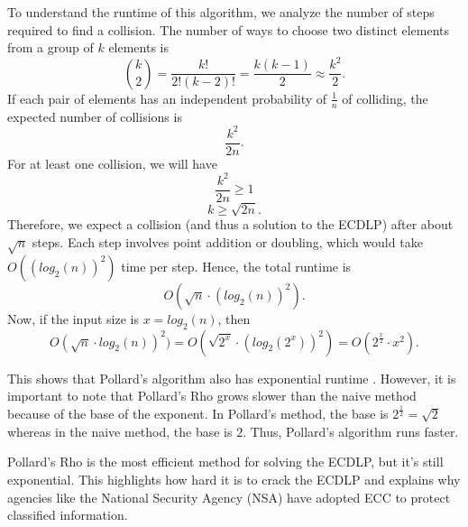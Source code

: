 \documentclass[11pt]{article}
\begin{document}
\vspace{0.3cm}

To understand the runtime of this algorithm, we analyze the number of steps required to find a collision. The number of ways to choose two distinct elements from a group of \(k\) elements is
\[\binom{k}{2} = \frac{k!}{2!(k-2)!} = \frac{k(k-1)}{2} \approx \frac{k^2}{2}.\]
If each pair of elements has an independent probability of \(\frac{1}{n}\) of colliding, the expected number of collisions is
\[\frac{k^2}{2n}.\]
For at least one collision, we will have
\[\frac{k^2}{2n} \geq 1\] 
\[k \geq \sqrt{2n}.\]
Therefore, we expect a collision (and thus a solution to the ECDLP) after about \(\sqrt{n}\) steps. Each step involves point addition or doubling, which would take \(O((log_2(n))^2)\) time per step. Hence, the total runtime is 
\[O(\sqrt{n}\cdot (log_2(n))^2).\] 
Now, if the input size is \(x=log_2(n)\), then 
\[O(\sqrt{n}\cdot log_2(n))^2)=O(\sqrt{2^x}\cdot (log_2{(2^x)})^2)=O(2^\frac{x}{2}\cdot x^2).\] 

This shows that Pollard's algorithm also has exponential runtime \cite{gill}. However, it is important to note that Pollard's Rho grows slower than the naive method because of the base of the exponent. In Pollard's method, the base is \(2^\frac{1}{2}=\sqrt{2}\) whereas in the naive method, the base is \(2\). Thus, Pollard's algorithm runs faster. 

\vspace{0.3cm}

Pollard’s Rho is the most efficient method for solving the ECDLP, but it’s still exponential. This highlights how hard it is to crack the ECDLP and explains why agencies like the National Security Agency (NSA) have adopted ECC to protect classified information.

\vspace{0.3cm}
\end{document}
